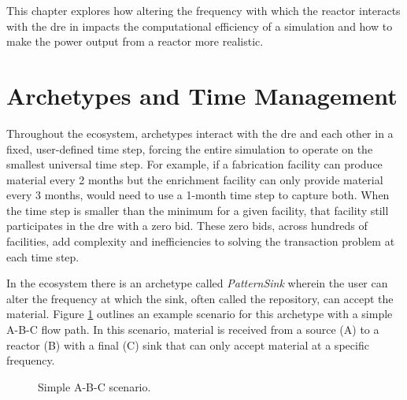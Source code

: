This chapter explores how altering the frequency with which the \cycamore reactor interacts with the \gls{dre} in \cyclus impacts the computational efficiency of a simulation and how to make the power output from a reactor more realistic.

\section{Archetypes and Time Management}
\label{sec:archetypes_and_time_management}

Throughout the \cyclus ecosystem, archetypes interact with the \gls{dre} and
each other in a fixed, user-defined time step, forcing the entire simulation
to operate on the smallest universal time step. For example, if a fabrication
facility can produce material every 2 months but the enrichment facility can
only provide material every 3 months, \cyclus would need to use a 1-month time step to capture both. When the time step is smaller than the minimum for a given
facility, that facility still participates in the \gls{dre} with a zero bid.
These zero bids, across hundreds of facilities, add complexity and
inefficiencies to solving the transaction problem at each time step.

In the \cyclus ecosystem there is an archetype called \textit{PatternSink} wherein the user can alter the frequency at which the sink, often called the repository, can accept the material. Figure \ref{fig:a-b-c} outlines an example scenario for this archetype with a simple A-B-C flow path. In this scenario, material is received from a source (A) to a reactor (B) with a final (C) sink that can only accept material at a specific frequency.

\begin{figure}[H]
    \centering
    \caption{Simple A-B-C scenario.}
    \label{fig:a-b-c}
\end{figure}


